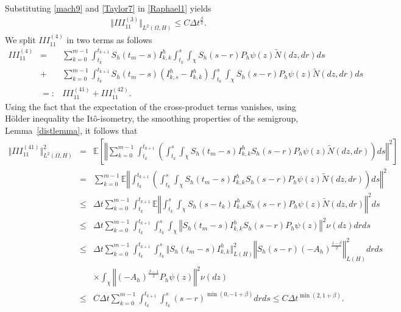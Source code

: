 \documentclass[review,12pt]{elsarticle}
\newcommand{\lemref}[1]{{Lemma~\ref{#1}}}
\begin{document}
 Substituting \eqref{mach9} and \eqref{Taylor7} in \eqref{Raphael1} yields
 \begin{eqnarray}
 \label{mach10}
 \Vert III_{11}^{(3)}\Vert_{L^2(\Omega, H)}\leq C\Delta t^{\frac{\beta}{2}}.
 \end{eqnarray}
 We split $III_{11}^{(4)}$ in two terms as follows
 \begin{eqnarray}
 \label{Raphael2}
 III_{11}^{(4)}&=&\sum_{k=0}^{m-1}\int_{t_k}^{t_{k+1}}S_h(t_m-s)I^h_{k,k}\int_{t_k}^s\int_{\chi}S_h(s-r)P_h\psi(z)\widetilde{N}(dz,dr)ds\nonumber\\
 &+&\sum_{k=0}^{m-1}\int_{t_k}^{t_{k+1}}S_h(t_m-s)\left(I^h_{k,s}-I^h_{k,k}\right)\int_{t_k}^s\int_{\chi}S_h(s-r)P_h\psi(z)\widetilde{N}(dz,dr)ds\nonumber\\
 &=:& III_{11}^{(41)}+III_{11}^{(42)}.
 \end{eqnarray}
Using the fact that the expectation of the cross-product terms vanishes, using H\"{o}lder inequality the It\^{o}-isometry, the smoothing properties of the semigroup, \lemref{distlemma}, it follows that
\begin{eqnarray}
\label{Taylor8}
\Vert III_{11}^{(41)}\Vert_{L^2(\Omega,H)}^2&=&\mathbb{E}
\left[\left\Vert\sum_{k=0}^{m-1}\int_{t_k}^{t_{k+1}}\left(\int_{t_k}^s\int_{\chi}S_h(t_m-s)I^h_{k,k}S_h(s-r)P_h\psi(z)\widetilde{N}(dz,dr)\right)ds\right\Vert^2\right]\nonumber\\
&=&\sum_{k=0}^{m-1}\mathbb{E}
\left\Vert\int_{t_k}^{t_{k+1}}\left(\int_{t_k}^s\int_{\chi}S_h(t_m-s)I^h_{k,k}S_h(s-r)P_h\psi(z)\widetilde{N}(dz,dr)\right)ds\right\Vert^2\nonumber\\
&\leq& \Delta t\sum_{k=0}^{m-1}\int_{t_k}^{t_{k+1}}\mathbb{E}\left\Vert\int_{t_k}^s\int_{\chi}S_h(s-t_k)I^h_{k,k}S_h(s-r)P_h\psi(z)\widetilde{N}(dz,dr)\right\Vert^2ds\nonumber\\
&\leq& \Delta t\sum_{k=0}^{m-1}\int_{t_k}^{t_{k+1}}\int_{t_k}^s\int_{\chi}\left\Vert S_h(t_m-s)I^h_{k,k}S_h(s-r)P_h\psi(z)\right\Vert^2\nu(dz)drds\nonumber\\
&\leq& \Delta t\sum_{k=0}^{m-1}\int_{t_k}^{t_{k+1}}\int_{t_k}^s\Vert S_h(t_m-s)I^h_{k,k}\Vert^2_{L(H)}\left\Vert S_h(s-r)(-A_h)^{\frac{1-\beta}{2}}\right\Vert^2_{L(H)}drds\nonumber\\
&&\times\int_{\chi}\left\Vert (-A_h)^{\frac{\beta-1}{2}}P_h\psi(z)\right\Vert^2\nu(dz)\nonumber\\
&\leq& C\Delta t\sum_{k=0}^{m-1}\int_{t_k}^{t_{k+1}}\int_{t_k}^s(s-r)^{\min(0,-1+\beta)}drds\leq C\Delta t^{\min(2,1+\beta)}.
\end{eqnarray}
\end{document}
